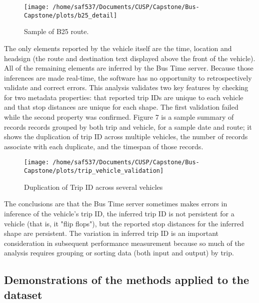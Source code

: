 \documentclass[12pt,journal,compsoc]{IEEEtran}
\begin{document}
\begin{figure}[!ht]
\label{b26}
  \caption{Sample of B25 route.}
  \centering
    \texttt{[image: /home/saf537/Documents/CUSP/Capstone/Bus-Capstone/plots/b25\_detail]}
\end{figure}

The only elements reported by the vehicle itself are the time, location and headsign (the route and destination text displayed above the front of the vehicle).  All of the remaining elements are inferred by the Bus Time server.  Because those inferences are made real-time, the software has no opportunity to retrospectively validate and correct errors.  This analysis validates two key features by checking for two metadata properties: that reported trip IDs are unique to each vehicle and that stop distances are unique for each shape.  The first validation failed while the second property was confirmed.  Figure 7 is a sample summary of records records grouped by both trip and vehicle, for a sample date and route; it shows the duplication of trip ID across multiple vehicles, the number of records associate with each duplicate, and the timespan of those records.

%
\begin{figure}[!ht]
\label{trip_val}
  \caption{Duplication of Trip ID across several vehicles}
  \centering
    \texttt{[image: /home/saf537/Documents/CUSP/Capstone/Bus-Capstone/plots/trip\_vehicle\_validation]}
\end{figure}

The conclusions are that the Bus Time server sometimes makes errors in inference of the vehicle's trip ID, the inferred trip ID is not persistent for a vehicle (that is, it "flip flops"), but the reported stop distances for the inferred shape are persistent.  The variation in inferred trip ID is an important consideration in subsequent performance measurement because so much of the analysis requires grouping or sorting data (both input and output) by trip.




\subsection{Demonstrations of the methods applied to the dataset}
\end{document}
